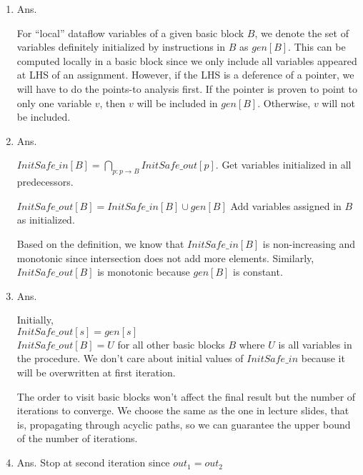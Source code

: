 \documentclass[11pt]{homework}
\begin{document}
\question
\begin{enumerate}[label=(\alph*)]

\item Ans.

For ``local'' dataflow variables of a given basic block $B$, we denote the set of variables definitely initialized by instructions in $B$ as $gen[B]$.
This can be computed locally in a basic block since we only include all variables appeared at LHS of an assignment.
However, if the LHS is a deference of a pointer, we will have to do the points-to analysis first.
If the pointer is proven to point to only one variable $v$,
then $v$ will be included in $gen[B]$.
Otherwise, $v$ will not be included.

\item Ans.

$InitSafe\_in[B] = \bigcap\limits_{p:p \to B} InitSafe\_out[p]$. \quad Get variables initialized in all predecessors.

$InitSafe\_out[B] = InitSafe\_in[B] \cup gen[B]$ \quad Add variables assigned in $B$ as initialized.

Based on the definition, we know that $InitSafe\_in[B]$ is non-increasing and monotonic
since intersection does not add more elements.
Similarly, $InitSafe\_out[B]$ is monotonic because $gen[B]$ is constant.

\item Ans.

Initially,\\
$InitSafe\_out[s]= gen[s]$\\
$InitSafe\_out[B] = U$ for all other basic blocks $B$ where $U$ is all variables in the procedure.
We don't care about initial values of $InitSafe\_in$ because it will be overwritten at first iteration.  

The order to visit basic blocks won't affect the final result but the number of iterations to converge.
We choose the same as the one in lecture slides, that is, propagating through acyclic paths,
so we can guarantee the upper bound of the number of iterations.

\pagebreak

\item Ans. Stop at second iteration since $out_1 = out_2$


\end{enumerate}
\end{document}
